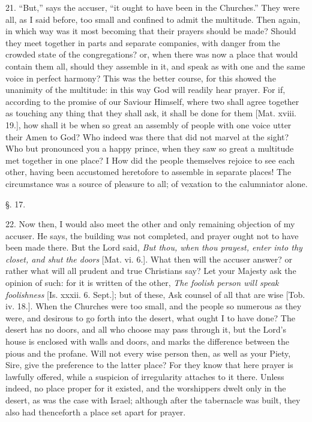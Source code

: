 21. ``But,'' says the accuser, ``it ought to have been in the Churches.''
They were all, as I said before, too small and confined to admit the
multitude. Then again, in which way was it most becoming that their
prayers should be made? Should they meet together in parts and
separate companies, with danger from the crowded state of the
congregations? or, when there was now a place that would contain them
all, should they assemble in it, and speak as with one and the same
voice in perfect harmony? This was the better course, for this showed
the unanimity of the multitude: in this way God will readily hear
prayer. For if, according to the promise of our Saviour Himself, where
two shall agree together as touching any thing that they shall ask, it
shall be done for them [Mat. xviii. 19.], how shall it be when so
great an assembly of people with one voice utter their Amen to God?
Who indeed was there that did not marvel at the sight? Who but
pronounced you a happy prince, when they saw so great a multitude met
together in one place? I How did the people themselves rejoice to see
each other, having been accustomed heretofore to assemble in separate
places! The circumstance was a source of pleasure to all; of vexation
to the calumniator alone.

§. 17.

22. Now then, I would also meet the other and only remaining objection
of my accuser. He says, the building was not completed, and prayer
ought not to have been made there. But the Lord said, \emph{But thou, when thou prayest,
enter into thy closet, and shut the doors} [Mat. vi. 6.]. What then will the accuser
answer? or rather what will all prudent and true Christians say? Let
your Majesty ask the opinion of such: for it is written of the other, \emph{The
foolish person will speak foolishness} [Is. xxxii. 6. Sept.]; but of these, Ask
counsel of all that are wise [Tob. iv. 18.]. When the Churches were
too small, and the people so numerous as they were, and desirous to go
forth into the desert, what ought I to have done? The desert has no
doors, and all who choose may pass through it, but the Lord's house is
enclosed with walls and doors, and marks the difference between the
pious and the profane. Will not every wise person then, as well as
your Piety, Sire, give the preference to the latter place? For they
know that here prayer is lawfully offered, while a suspicion of
irregularity attaches to it there. Unless indeed, no place proper for
it existed, and the worshippers dwelt only in the desert, as was the
case with Israel; although after the tabernacle was built, they also
had thenceforth a place set apart for prayer.

